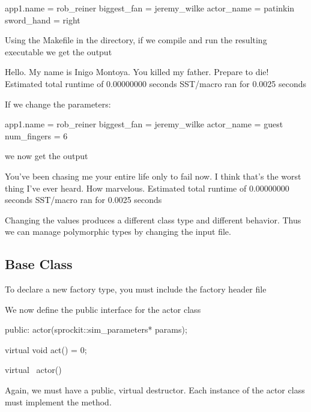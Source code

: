 \begin{ViFile}
app1.name = rob_reiner
biggest_fan = jeremy_wilke
actor_name = patinkin
sword_hand = right
\end{ViFile}

Using the Makefile in the directory, if we compile and run the resulting executable we get the output

\begin{ViFile}
Hello. My name is Inigo Montoya. You killed my father. Prepare to die!
Estimated total runtime of           0.00000000 seconds
SST/macro ran for       0.0025 seconds
\end{ViFile}

If we change the parameters:

\begin{ViFile}
app1.name = rob_reiner
biggest_fan = jeremy_wilke
actor_name = guest
num_fingers = 6
\end{ViFile}

we now get the output

\begin{ViFile}
You've been chasing me your entire life only to fail now.
I think that's the worst thing I've ever heard. How marvelous.
Estimated total runtime of           0.00000000 seconds
SST/macro ran for       0.0025 seconds
\end{ViFile}

Changing the values produces a different class type and different behavior.
Thus we can manage polymorphic types by changing the input file.

\subsection{Base Class}\label{subsec:baseClass}
To declare a new factory type, you must include the factory header file

\begin{CppCode}
#include <sprockit/factories/factory.h>

namespace sstmac {
    namespace tutorial {

class actor
{
\end{CppCode}


We now define the public interface for the actor class

\begin{CppCode}
 public:
  actor(sprockit::sim_parameters* params);
  
  virtual void
  act() = 0;

  virtual ~actor(){}
\end{CppCode}
Again, we must have a public, virtual destructor.
Each instance of the actor class must implement the  method.

